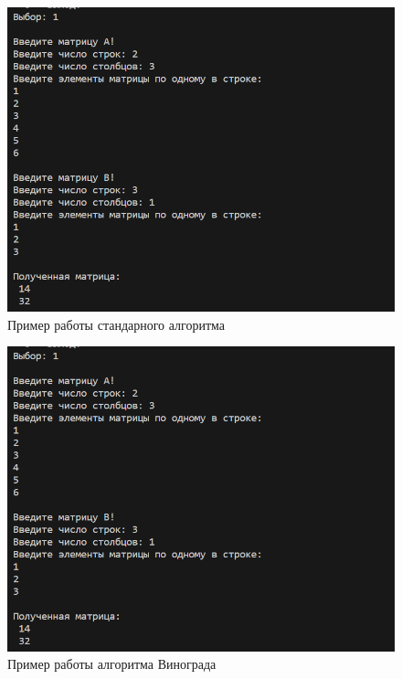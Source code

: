 \begin{figure}[H]
	\begin{center}
		\includegraphics[scale=0.8]{img/example.png}
	\end{center}
	\captionsetup{justification=centering}
	\caption{Пример работы стандарного алгоритма}
	\label{img:example}
\end{figure}
\begin{figure}[H]
	\begin{center}
		\includegraphics[scale=0.8]{img/example.png}
	\end{center}
	\captionsetup{justification=centering}
	\caption{Пример работы алгоритма Винограда}
	\label{img:example1}
\end{figure}
